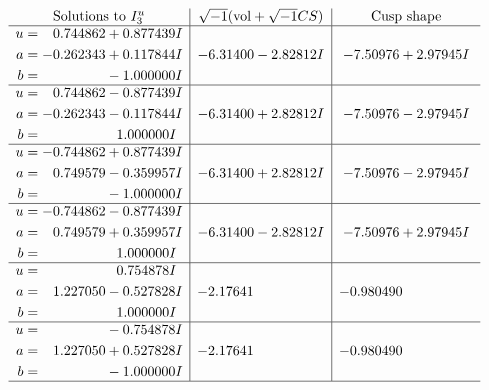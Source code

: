 \documentclass[1p]{elsarticle_modified}
\theoremstyle{definition}
\newcommand{\I}{\sqrt{-1}}
\begin{document}
$$\begin{array}{c|c|c}  
\text{Solutions to }I^u_{3}& \I (\text{vol} + \sqrt{-1}CS) & \text{Cusp shape}\\
 \hline 
\begin{aligned}
u &= \phantom{-}0.744862 + 0.877439 I \\
a &= -0.262343 + 0.117844 I \\
b &= \phantom{-0.000000 } -1.000000 I\end{aligned}
 & -6.31400 - 2.82812 I & -7.50976 + 2.97945 I \\ \hline\begin{aligned}
u &= \phantom{-}0.744862 - 0.877439 I \\
a &= -0.262343 - 0.117844 I \\
b &= \phantom{-0.000000 -}1.000000 I\end{aligned}
 & -6.31400 + 2.82812 I & -7.50976 - 2.97945 I \\ \hline\begin{aligned}
u &= -0.744862 + 0.877439 I \\
a &= \phantom{-}0.749579 - 0.359957 I \\
b &= \phantom{-0.000000 } -1.000000 I\end{aligned}
 & -6.31400 + 2.82812 I & -7.50976 - 2.97945 I \\ \hline\begin{aligned}
u &= -0.744862 - 0.877439 I \\
a &= \phantom{-}0.749579 + 0.359957 I \\
b &= \phantom{-0.000000 -}1.000000 I\end{aligned}
 & -6.31400 - 2.82812 I & -7.50976 + 2.97945 I \\ \hline\begin{aligned}
u &= \phantom{-0.000000 -}0.754878 I \\
a &= \phantom{-}1.227050 - 0.527828 I \\
b &= \phantom{-0.000000 -}1.000000 I\end{aligned}
 & -2.17641\phantom{ +0.000000I} & -0.980490\phantom{ +0.000000I} \\ \hline\begin{aligned}
u &= \phantom{-0.000000 } -0.754878 I \\
a &= \phantom{-}1.227050 + 0.527828 I \\
b &= \phantom{-0.000000 } -1.000000 I\end{aligned}
 & -2.17641\phantom{ +0.000000I} & -0.980490\phantom{ +0.000000I}\\
 \hline 
 \end{array}$$\newpage\newpage\renewcommand{\arraystretch}{1}
\end{document}

